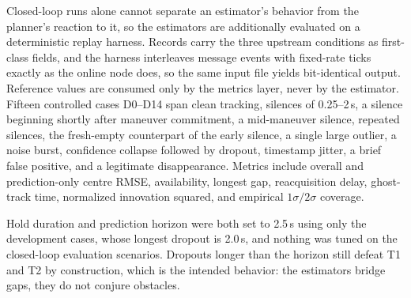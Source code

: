 Closed-loop runs alone cannot separate an estimator's behavior from the
planner's reaction to it, so the estimators are additionally evaluated on a
deterministic replay harness. Records carry the three upstream conditions as
first-class fields, and the harness interleaves message events with
fixed-rate ticks exactly as the online node does, so the same input file
yields bit-identical output. Reference values are consumed only by the
metrics layer, never by the estimator. Fifteen controlled cases D0--D14 span
clean tracking, silences of 0.25--2\,s, a silence beginning shortly after
maneuver commitment, a mid-maneuver silence, repeated silences, the
fresh-empty counterpart of the early silence, a single large outlier, a noise
burst, confidence collapse followed by dropout, timestamp jitter, a brief
false positive, and a legitimate disappearance. Metrics include overall and
prediction-only centre RMSE, availability, longest gap, reacquisition delay,
ghost-track time, normalized innovation squared, and empirical $1\sigma /
2\sigma$ coverage.

Hold duration and prediction horizon were both set to 2.5\,s using only the
development cases, whose longest dropout is 2.0\,s, and nothing was tuned on
the closed-loop evaluation scenarios. Dropouts longer than the horizon still
defeat T1 and T2 by construction, which is the intended behavior: the
estimators bridge gaps, they do not conjure obstacles.
